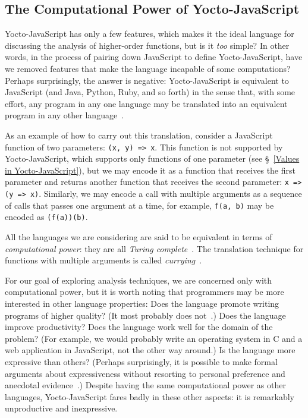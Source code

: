 \documentclass[12pt, oneside]{book}
\begin{document}
\begin{mdframed}[frametitle = {Advanced}]

\subsection{The Computational Power of Yocto-JavaScript}
\label{The Computational Power of Yocto-JavaScript}

Yocto-JavaScript has only a few features, which makes it the ideal language for discussing the analysis of higher-order functions, but is it \emph{too} simple? In other words, in the process of pairing down JavaScript to define Yocto-JavaScript, have we removed features that make the language incapable of some computations? Perhaps surprisingly, the answer is negative: Yocto-JavaScript is equivalent to JavaScript (and Java, Python, Ruby, and so forth) in the sense that, with some effort, any program in any one language may be translated into an equivalent program in any other language~\cite[§~6]{understanding-computation}.

As an example of how to carry out this translation, consider a JavaScript function of two parameters: \texttt{(x, y) => x}. This function is not supported by Yocto-JavaScript, which supports only functions of one parameter (see §~\ref{Values in Yocto-JavaScript}), but we may encode it as a function that receives the first parameter and returns another function that receives the second parameter: \texttt{x => (y => x)}. Similarly, we may encode a call with multiple arguments as a sequence of calls that passes one argument at a time, for example, \texttt{f(a, b)} may be encoded as \texttt{(f(a))(b)}.

\begin{mdframed}[frametitle = {Technical Terms}]
All the languages we are considering are said to be equivalent in terms of \emph{computational power}: they are all \emph{Turing complete}~\cite[§~7]{understanding-computation}. The translation technique for functions with multiple arguments is called \emph{currying}~\cite[page~163]{understanding-computation}.
\end{mdframed}

For our goal of exploring analysis techniques, we are concerned only with computational power, but it is worth noting that programmers may be more interested in other language properties: Does the language promote writing programs of higher quality? (It most probably does not~\cite{code-quality}.) Does the language improve productivity? Does the language work well for the domain of the problem? (For example, we would probably write an operating system in C and a web application in JavaScript, not the other way around.) Is the language more expressive than others? (Perhaps surprisingly, it is possible to make formal arguments about expressiveness without resorting to personal preference and anecdotal evidence~\cite{expressive-power}.) Despite having the same computational power as other languages, Yocto-JavaScript fares badly in these other aspects: it is remarkably unproductive and inexpressive.


\end{mdframed}
\end{document}
